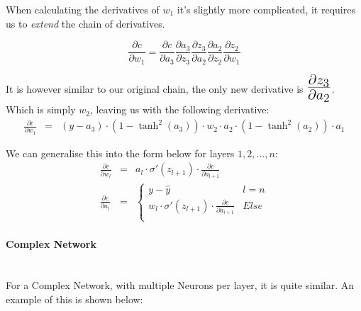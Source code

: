 \begin{flushleft}
                    \vspace{0.2cm}

                    When calculating the derivatives of $w_1$ it's slightly more complicated, it requires us to \textit{extend}
                    the chain of derivatives.

                    \[\frac{\partial c}{\partial w_1} = \frac{\partial c}{\partial a_3} \frac{\partial a_3}{\partial z_3} \frac{\partial z_3}{\partial a_2} \frac{\partial a_2}{\partial z_2} \frac{\partial z_2}{\partial w_1}\]

                    It is however similar to our original chain, the only new derivative is $\mathLarge{\frac{\partial z_3}{\partial a_2}}$.
                    Which is simply $w_2$, leaving us with the following derivative:
                    \begin{eqnarray*}
                        \frac{\partial c}{\partial w_{1}} &=& (y - a_3) \cdot (1 - \tanh^{2}(a_3)) \cdot w_2 \cdot a_2 \cdot (1 - \tanh^{2}(a_2)) \cdot a_1
                    \end{eqnarray*}

                    We can generalise this into the form below for layers $1,2, \hdots, n$:
                    \begin{eqnarray*}
                        \frac{\partial c}{\partial w_{l}} &=& a_l \cdot \sigma'(z_{l+1}) \cdot \frac{\partial c}{\partial a_{l+1}} \\
                        \frac{\partial c}{\partial a_{l}} &=&
                        \begin{cases}
                            y - \hat{y} & l = n \\
                            w_l \cdot \sigma'(z_{l+1}) \cdot \frac{\partial c}{\partial a_{l+1}} & Else \\
                        \end{cases} 
                    \end{eqnarray*}

                \paragraph{Complex Network} \mbox{} \\ 
                    For a Complex Network, with multiple Neurons per layer, it is quite similar. An example of this is shown below: \\


\end{flushleft}
